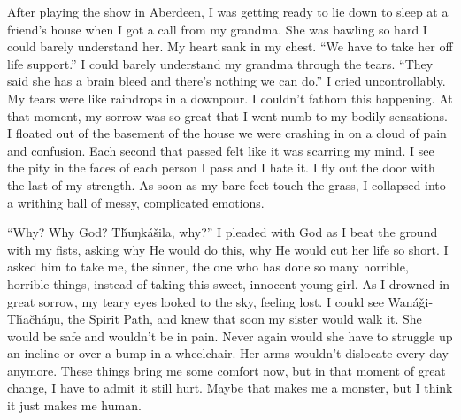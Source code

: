 \documentclass[12pt, letterpaper]{article}
\begin{document}
\begin{flushleft}
After playing the show in Aberdeen,
I was getting ready to lie down to sleep at a friend's house
when I got a call from my grandma.
She was bawling so hard I could barely understand her.
My heart sank in my chest.
``We have to take her off life support.\@''
I could barely understand my grandma through the tears.
``They said she has a brain bleed and there's nothing we can do.\@''
I cried uncontrollably.
My tears were like raindrops in a downpour.
I couldn’t fathom this happening.
At that moment, my sorrow was so great
that I went numb to my bodily sensations.
I floated out of the basement of the house
we were crashing in on a cloud of pain and confusion.
Each second that passed felt like it was scarring my mind.
I see the pity in the faces of each person I pass and I hate it.
I fly out the door with the last of my strength. 
As soon as my bare feet touch the grass,
I collapsed into a writhing ball of messy, complicated emotions.
\vspace{5mm}

``Why? Why God? Tȟuŋkášila, why?\@''
I pleaded with God as I beat the ground with my fists,
asking why He would do this, why He would cut her life so short.
I asked him to take me, the sinner, the one who has done so many horrible,
horrible things, instead of taking this sweet, innocent young girl.
As I drowned in great sorrow, 
my teary eyes looked to the sky, feeling lost.
I could see Wanáǧi-Tȟačháŋu, the Spirit Path,
and knew that soon my sister would walk it.
She would be safe and wouldn't be in pain.
Never again would she have to struggle up an
incline or over a bump in a wheelchair.
Her arms wouldn't dislocate every day anymore.
These things bring me some comfort now, 
but in that moment of great change,
I have to admit it still hurt. 
Maybe that makes me a monster,
but I think it just makes me human.
\vspace{5mm}






\end{flushleft}
\end{document}
